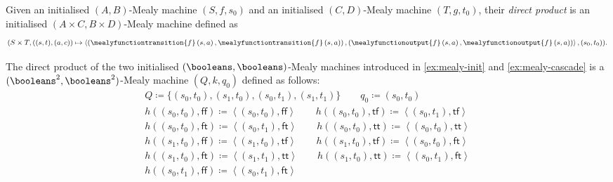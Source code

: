 \begin{definition}
    Given an initialised \((A,B)\)-Mealy machine \((S,f,s_0)\) and an
    initialised \((C,D)\)-Mealy machine \((T,g,t_0)\), their
    \emph{direct product} is an initialised \((A \times C,B \times D)\)-Mealy
    machine defined as \[
        (S \times T, \left((s, t), (a, c)\right) \mapsto \left\langle
        \left(
        \mealyfunctiontransition{f}\left(s, a\right),
        \mealyfunctiontransition{f}\left(s, a\right)
        \right),
        \left(
        \mealyfunctionoutput{f}\left(s, a\right),
        \mealyfunctionoutput{f}\left(s, a\right)
        \right)\right\rangle,
        (s_0, t_0)
        ).
    \]
\end{definition}

\begin{example}\label{ex:mealy-direct}
    The direct product of the two initialised \((\booleans,\booleans)\)-Mealy
    machines introduced in \cref{ex:mealy-init} and \cref{ex:mealy-cascade} is
    a \((\booleans^2,\booleans^2)\)-Mealy machine \((Q,k,q_0)\) defined as
    follows:
    \begin{gather*}
        Q \coloneqq \{(s_0,t_0), (s_1,t_0), (s_0,t_1), (s_1,t_1)\}
        \qquad
        q_0 \coloneqq (s_0,t_0)
        \\
        h((s_0, t_0), \mathsf{ff})
        \coloneqq
        \left\langle(s_0, t_0), \mathsf{ff}\right\rangle
        \qquad
        h((s_0, t_0), \mathsf{tf})
        \coloneqq
        \left\langle(s_0, t_1), \mathsf{tf}\right\rangle
        \\
        h((s_0, t_0), \mathsf{ft})
        \coloneqq
        \left\langle(s_0, t_1), \mathsf{ft}\right\rangle
        \qquad
        h((s_0, t_0), \mathsf{tt})
        \coloneqq
        \left\langle(s_0, t_0), \mathsf{tt}\right\rangle
        \\
        h((s_1, t_0), \mathsf{ff})
        \coloneqq
        \left\langle(s_1, t_0), \mathsf{tf}\right\rangle
        \qquad
        h((s_1, t_0), \mathsf{tf})
        \coloneqq
        \left\langle(s_0, t_0), \mathsf{ft}\right\rangle
        \\
        h((s_1, t_0), \mathsf{ft})
        \coloneqq
        \left\langle(s_1, t_1), \mathsf{tt}\right\rangle
        \qquad
        h((s_1, t_0), \mathsf{tt})
        \coloneqq
        \left\langle(s_0, t_1), \mathsf{ft}\right\rangle
        \\
        h((s_0, t_1), \mathsf{ff})
        \coloneqq
        \left\langle(s_0, t_1), \mathsf{ft}\right\rangle

\end{gather*}
\end{example}
